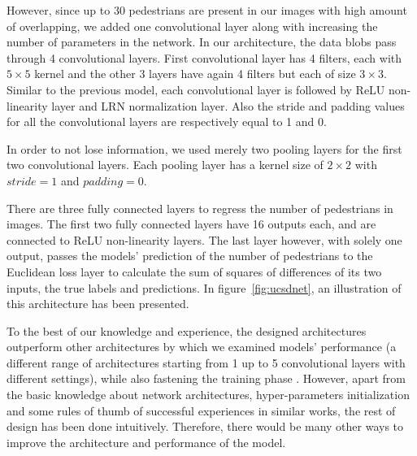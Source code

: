 \noindent However, since up to 30 pedestrians are present in our images with high amount of overlapping, we added one convolutional layer along with increasing the number of parameters in the network. In our architecture, the data blobs pass through 4 convolutional layers. First convolutional layer has 4 filters, each with $5\times5$ kernel and the other 3 layers have again 4 filters but each of size $3\times3$. Similar to the previous model, each convolutional layer is followed by ReLU non-linearity layer and LRN normalization layer. Also the stride and padding values for all the convolutional layers are respectively equal to 1 and 0. 

\indent In order to not lose information, we used merely two pooling layers for the first two convolutional layers. Each pooling layer has a kernel size of $2\times2$ with $stride = 1$  and $padding = 0$. 

There are three fully connected layers to regress the number of pedestrians in images. The first two fully connected layers have 16 outputs each, and are connected to ReLU non-linearity layers. The last layer however, with solely one output, passes the models' prediction of the number of pedestrians to the Euclidean loss layer to calculate the sum of squares of differences of its two inputs, the true labels and predictions. In figure~\ref{fig:ucsdnet}, an illustration of this architecture has been presented.

To the best of our knowledge and experience, the designed architectures outperform other architectures by which we examined models' performance (a different range of architectures starting from 1 up to 5 convolutional layers with different settings), while also fastening the training phase . However, apart from the basic knowledge about network architectures, hyper-parameters initialization and some rules of thumb of successful experiences in similar works, the rest of design has been done intuitively. Therefore, there would be many other ways to improve the architecture and performance of the model.  

